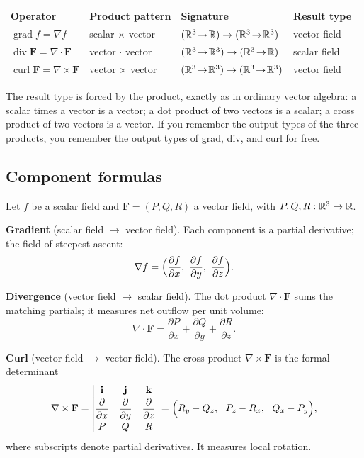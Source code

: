 \documentclass{essay}
\newcommand{\F}{\mathbf{F}}
\newcommand{\grad}{\operatorname{grad}}
\newcommand{\dive}{\operatorname{div}}
\newcommand{\curl}{\operatorname{curl}}
\begin{document}
\begin{center}
  \renewcommand{\arraystretch}{1.5}
  \begin{tabular}{@{}l l l l@{}}
    \toprule
    \textbf{Operator} & \textbf{Product pattern} & \textbf{Signature} & \textbf{Result type} \\
    \midrule
    \(\grad f = \nabla f\)           & scalar \(\times\) vector & \((\mathbb{R}^{3}\!\to\!\mathbb{R})\to(\mathbb{R}^{3}\!\to\!\mathbb{R}^{3})\) & vector field \\
    \(\dive \F = \nabla\cdot\F\)     & vector \(\cdot\) vector  & \((\mathbb{R}^{3}\!\to\!\mathbb{R}^{3})\to(\mathbb{R}^{3}\!\to\!\mathbb{R})\) & scalar field \\
    \(\curl \F = \nabla\times\F\)    & vector \(\times\) vector & \((\mathbb{R}^{3}\!\to\!\mathbb{R}^{3})\to(\mathbb{R}^{3}\!\to\!\mathbb{R}^{3})\) & vector field \\
    \bottomrule
  \end{tabular}
\end{center}

The result type is forced by the product, exactly as in ordinary vector algebra:
a scalar times a vector is a vector; a dot product of two vectors is a scalar; a
cross product of two vectors is a vector. If you remember the output types of the
three products, you remember the output types of grad, div, and curl for free.

\subsection{Component formulas}

Let \(f\) be a scalar field and \(\F=(P,Q,R)\) a vector field, with \(P,Q,R:\mathbb{R}^{3}\to\mathbb{R}\).

\textbf{Gradient} (scalar field \(\to\) vector field). Each component is a partial
derivative; the field of steepest ascent:
\[
  \nabla f = \Bigl(\frac{\partial f}{\partial x},\ \frac{\partial f}{\partial y},\
  \frac{\partial f}{\partial z}\Bigr).
\]

\textbf{Divergence} (vector field \(\to\) scalar field). The dot product
\(\nabla\cdot\F\) sums the matching partials; it measures net outflow per unit volume:
\[ \nabla\cdot\F = \frac{\partial P}{\partial x} + \frac{\partial Q}{\partial y} + \frac{\partial R}{\partial z}. \]

\textbf{Curl} (vector field \(\to\) vector field). The cross product
\(\nabla\times\F\) is the formal determinant
\[
  \nabla\times\F =
  \begin{vmatrix}
    \mathbf{i} & \mathbf{j} & \mathbf{k} \\[2pt]
    \dfrac{\partial}{\partial x} & \dfrac{\partial}{\partial y} & \dfrac{\partial}{\partial z} \\[6pt]
    P & Q & R
  \end{vmatrix}
  =\Bigl(R_{y} - Q_{z},\ \ P_{z} - R_{x},\ \ Q_{x} - P_{y}\Bigr),
\]
where subscripts denote partial derivatives. It measures local rotation.
\end{document}
